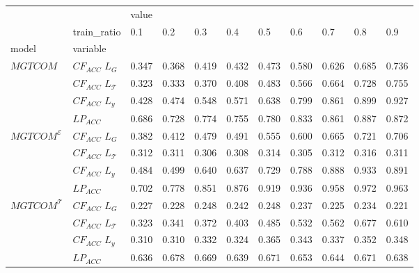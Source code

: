 \begin{tabular}{lllllllllll}
\toprule
                       & {} & \multicolumn{9}{l}{value} \\
                       & train_ratio &    0.1 &    0.2 &    0.3 &    0.4 &    0.5 &    0.6 &    0.7 &    0.8 &    0.9 \\
model & variable &        &        &        &        &        &        &        &        &        \\
\midrule
$MGTCOM$ & $CF_{ACC}$ $L_G$ &  0.347 &  0.368 &  0.419 &  0.432 &  0.473 &  0.580 &  0.626 &  0.685 &  0.736 \\
                       & $CF_{ACC}$ $L_\mathcal{T}$ &  0.323 &  0.333 &  0.370 &  0.408 &  0.483 &  0.566 &  0.664 &  0.728 &  0.755 \\
                       & $CF_{ACC}$ $L_y$ &  0.428 &  0.474 &  0.548 &  0.571 &  0.638 &  0.799 &  0.861 &  0.899 &  0.927 \\
                       & $LP_{ACC}$ &  0.686 &  0.728 &  0.774 &  0.755 &  0.780 &  0.833 &  0.861 &  0.887 &  0.872 \\
$MGTCOM^{\mathcal{E}}$ & $CF_{ACC}$ $L_G$ &  0.382 &  0.412 &  0.479 &  0.491 &  0.555 &  0.600 &  0.665 &  0.721 &  0.706 \\
                       & $CF_{ACC}$ $L_\mathcal{T}$ &  0.312 &  0.311 &  0.306 &  0.308 &  0.314 &  0.305 &  0.312 &  0.316 &  0.311 \\
                       & $CF_{ACC}$ $L_y$ &  0.484 &  0.499 &  0.640 &  0.637 &  0.729 &  0.788 &  0.888 &  0.933 &  0.891 \\
                       & $LP_{ACC}$ &  0.702 &  0.778 &  0.851 &  0.876 &  0.919 &  0.936 &  0.958 &  0.972 &  0.963 \\
$MGTCOM^{\mathcal{T}}$ & $CF_{ACC}$ $L_G$ &  0.227 &  0.228 &  0.248 &  0.242 &  0.248 &  0.237 &  0.225 &  0.234 &  0.221 \\
                       & $CF_{ACC}$ $L_\mathcal{T}$ &  0.323 &  0.341 &  0.372 &  0.403 &  0.485 &  0.532 &  0.562 &  0.677 &  0.610 \\
                       & $CF_{ACC}$ $L_y$ &  0.310 &  0.310 &  0.332 &  0.324 &  0.365 &  0.343 &  0.337 &  0.352 &  0.348 \\
                       & $LP_{ACC}$ &  0.636 &  0.678 &  0.669 &  0.639 &  0.671 &  0.653 &  0.644 &  0.671 &  0.638 \\
\bottomrule
\end{tabular}
